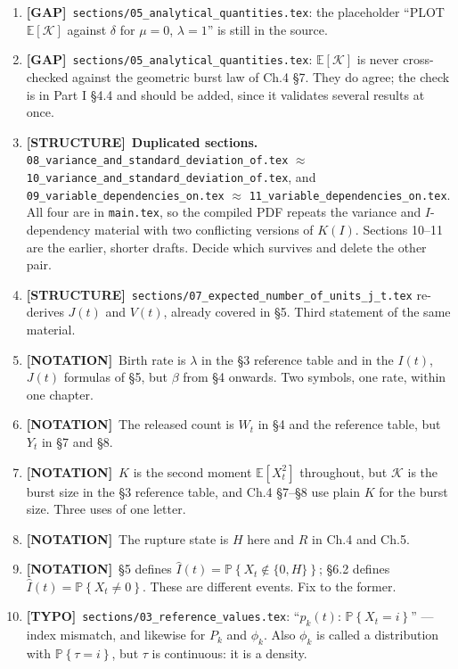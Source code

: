 \documentclass[11pt]{article}
\newcommand{\E}{\mathbb{E}}
\newcommand{\Prob}[1]{\mathbb{P}\!\left\{#1\right\}}
\newcommand{\xt}{X_t}
\newcommand{\wt}{W_t}
\newcommand{\Ihat}{\widehat{I}}
\theoremstyle{plain}
\theoremstyle{definition}
\theoremstyle{remark}
\newcommand{\GAP}{\textcolor{orange!80!black}{\textbf{[GAP]}}}
\newcommand{\NOT}{\textcolor{blue!60!black}{\textbf{[NOTATION]}}}
\newcommand{\TYP}{\textcolor{gray!80!black}{\textbf{[TYPO]}}}
\newcommand{\STR}{\textcolor{purple!70!black}{\textbf{[STRUCTURE]}}}
\begin{document}
\begin{enumerate}[leftmargin=2.2em,label=\textbf{3.\arabic*}]
\item \GAP\ \texttt{sections/05\_analytical\_quantities.tex}: the placeholder
``PLOT $\E[\mathcal K]$ against $\delta$ for $\mu=0$, $\lambda=1$'' is still in the source.

\item \GAP\ \texttt{sections/05\_analytical\_quantities.tex}: $\E[\mathcal K]$ is
never cross-checked against the geometric burst law of Ch.4 \S7. They do agree; the check
is in Part I \S4.4 and should be added, since it validates several results at once.

\item \STR\ \textbf{Duplicated sections.} \texttt{08\_variance\_and\_standard\_deviation\_of.tex}
$\approx$ \texttt{10\_variance\_and\_standard\_deviation\_of.tex}, and
\texttt{09\_variable\_dependencies\_on.tex} $\approx$
\texttt{11\_variable\_dependencies\_on.tex}. All four are \verb|| in
\texttt{main.tex}, so the compiled PDF repeats the variance and $I$-dependency material
with two conflicting versions of $K(I)$. Sections 10--11 are the earlier, shorter drafts.
Decide which survives and delete the other pair.

\item \STR\ \texttt{sections/07\_expected\_number\_of\_units\_j\_t.tex} re-derives $J(t)$
and $V(t)$, already covered in \S5. Third statement of the same material.

\item \NOT\ Birth rate is $\lambda$ in the \S3 reference table and in the $I(t)$, $J(t)$
formulas of \S5, but $\beta$ from \S4 onwards. Two symbols, one rate, within one chapter.

\item \NOT\ The released count is $\wt$ in \S4 and the reference table, but $Y_t$ in \S7
and \S8.

\item \NOT\ $K$ is the second moment $\E[\xt^2]$ throughout, but $\mathcal K$ is the burst
size in the \S3 reference table, and Ch.4 \S7--\S8 use plain $K$ for the burst size.
Three uses of one letter.

\item \NOT\ The rupture state is $H$ here and $R$ in Ch.4 and Ch.5.

\item \NOT\ \S5 defines $\Ihat(t)=\Prob{\xt\notin\{0,H\}}$; \S6.2 defines
$\Ihat(t)=\Prob{\xt\neq0}$. These are different events. Fix to the former.

\item \TYP\ \texttt{sections/03\_reference\_values.tex}: ``$p_k(t)$: $\Prob{\xt=i}$'' ---
index mismatch, and likewise for $P_k$ and $\phi_k$. Also $\phi_k$ is called a
distribution with $\Prob{\tau=i}$, but $\tau$ is continuous: it is a density.


\end{enumerate}
\end{document}
